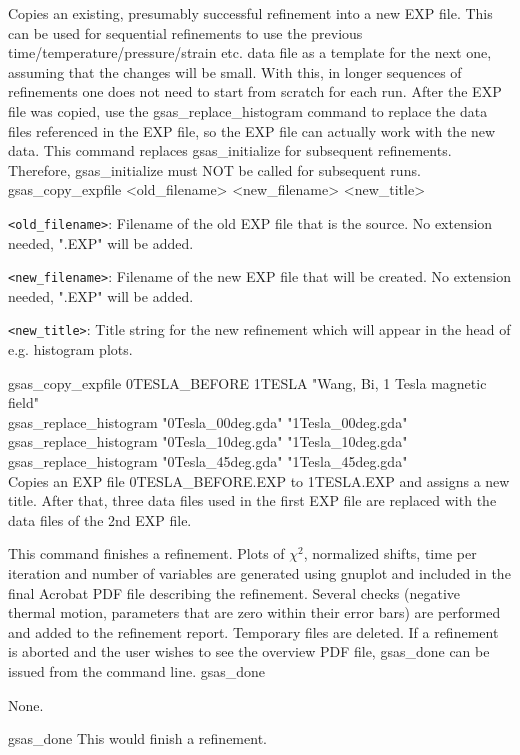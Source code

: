 {
Copies an existing, presumably successful refinement into a new EXP file. This can be used for sequential refinements to use the previous time/temperature/pressure/strain etc. data file as a template for the next one, assuming that the changes will be small. With this, in longer sequences of refinements one does not need to start from scratch for each run. After the EXP file was copied, use the gsas\_replace\_histogram command to replace the data files referenced in the EXP file, so the EXP file can actually work with the new data. This command replaces gsas\_initialize for subsequent refinements. Therefore, gsas\_initialize must NOT be called for subsequent runs.
}{
gsas\_copy\_expfile <old\_filename> <new\_filename> <new\_title>
}{
\item \texttt{<old\_filename>}: Filename of the old EXP file that is the source. No extension needed, ".EXP" will be added.
\item \texttt{<new\_filename>}: Filename of the new EXP file that will be created. No extension needed, ".EXP" will be added.
\item \texttt{<new\_title>}: Title string for the new refinement which will appear in the head of e.g. histogram plots.
}{
gsas\_copy\_expfile 0TESLA\_BEFORE 1TESLA "Wang, Bi, 1 Tesla magnetic field"\\
gsas\_replace\_histogram "0Tesla\_00deg.gda" "1Tesla\_00deg.gda"\\
gsas\_replace\_histogram "0Tesla\_10deg.gda" "1Tesla\_10deg.gda"\\
gsas\_replace\_histogram "0Tesla\_45deg.gda" "1Tesla\_45deg.gda"\\
}{
Copies an EXP file 0TESLA\_BEFORE.EXP to 1TESLA.EXP and assigns a new title. After that, three data files used in the first EXP file are replaced with the data files of the 2nd EXP file.
}

{
This command finishes a refinement. Plots of $\chi^2$, normalized shifts, time per iteration and number of variables are generated using gnuplot and included in the final Acrobat PDF file describing the refinement. Several checks (negative thermal motion, parameters that are zero within their error bars) are performed and added to the refinement report. Temporary files are deleted. If a refinement is aborted and the user wishes to see the overview PDF file, gsas\_done can be issued from the command line.
}{
gsas\_done
}{
\item None.
}{
gsas\_done
}{
This would finish a refinement.
}

